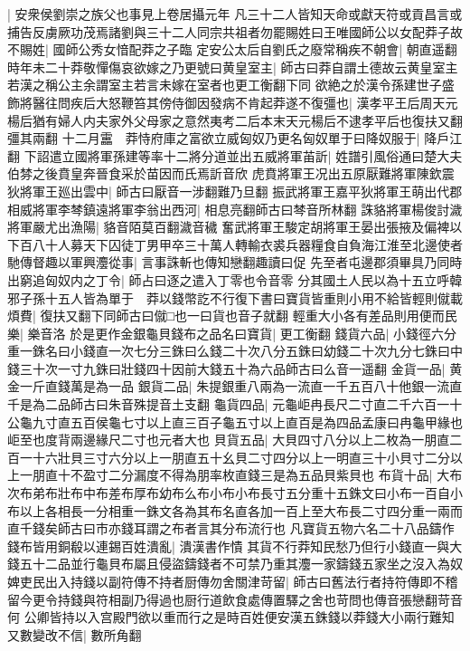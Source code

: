 |{
	安衆侯劉崇之族父也事見上卷居攝元年}
凡三十二人皆知天命或獻天符或貢昌言或捕告反虜厥功茂焉諸劉與三十二人同宗共祖者勿罷賜姓曰王唯國師公以女配莽子故不賜姓|{
	國師公秀女愔配莽之子臨}
定安公太后自劉氏之廢常稱疾不朝會|{
	朝直遥翻}
時年未二十莽敬憚傷哀欲嫁之乃更號曰黄皇室主|{
	師古曰莽自謂土德故云黄皇室主若漢之稱公主余謂室主若言未嫁在室者也更工衡翻下同}
欲絶之於漢令孫建世子盛飾將醫往問疾后大怒鞭笞其傍侍御因發病不肯起莽遂不復彊也|{
	漢孝平王后周天元楊后猶有婦人内夫家外父母家之意然夷考二后本末天元楊后不逮孝平后也復扶又翻彊其兩翻}
十二月靁　莽恃府庫之富欲立威匈奴乃更名匈奴單于曰降奴服于|{
	降戶江翻}
下詔遣立國將軍孫建等率十二將分道並出五威將軍苖訢|{
	姓譜引風俗通曰楚大夫伯棼之後賁皇奔晉食采於苗因而氏焉訢音欣}
虎賁將軍王况出五原厭難將軍陳欽震狄將軍王廵出雲中|{
	師古曰厭音一涉翻難乃旦翻}
振武將軍王嘉平狄將軍王萌出代郡相威將軍李棽鎮遠將軍李翁出西河|{
	相息亮翻師古曰棽音所林翻}
誅貉將軍楊俊討濊將軍嚴尤出漁陽|{
	貉音陌莫百翻濊音穢}
奮武將軍王駿定胡將軍王晏出張掖及偏裨以下百八十人募天下囚徒丁男甲卒三十萬人轉輸衣裘兵器糧食自負海江淮至北邊使者馳傳督趣以軍興灋從事|{
	言事誅斬也傳知戀翻趣讀曰促}
先至者屯邊郡須畢具乃同時出窮追匈奴内之丁令|{
	師占曰逐之遣入丁零也令音零}
分其國土人民以為十五立呼韓邪子孫十五人皆為單于　莽以錢幣訖不行復下書曰寶貨皆重則小用不給皆輕則僦載煩費|{
	復扶又翻下同師古曰僦□也一曰貨也音子就翻}
輕重大小各有差品則用便而民樂|{
	樂音洛}
於是更作金銀龜貝錢布之品名曰寶貨|{
	更工衡翻}
錢貨六品|{
	小錢徑六分重一銖名曰小錢直一次七分三銖曰么錢二十次八分五銖曰幼錢二十次九分七銖曰中錢三十次一寸九銖曰壯錢四十因前大錢五十為六品師古曰么音一遥翻}
金貨一品|{
	黄金一斤直錢萬是為一品}
銀貨二品|{
	朱提銀重八兩為一流直一千五百八十他銀一流直千是為二品師古曰朱音殊提音土支翻}
龜貨四品|{
	元龜岠冉長尺二寸直二千六百一十公龜九寸直五百侯龜七寸以上直三百子龜五寸以上直百是為四品孟康曰冉龜甲緣也岠至也度背兩邊緣尺二寸也元者大也}
貝貨五品|{
	大貝四寸八分以上二枚為一朋直二百一十六壯貝三寸六分以上一朋直五十幺貝二寸四分以上一明直三十小貝寸二分以上一朋直十不盈寸二分漏度不得為朋率枚直錢三是為五品貝紫貝也}
布貨十品|{
	大布次布弟布壯布中布差布厚布幼布么布小布小布長寸五分重十五銖文曰小布一百自小布以上各相長一分相重一銖文各為其布名直各加一百上至大布長二寸四分重一兩而直千錢矣師古曰市亦錢耳謂之布者言其分布流行也}
凡寶貨五物六名二十八品鑄作錢布皆用銅殽以連錫百姓潰亂|{
	潰漢書作憒}
其貨不行莽知民愁乃但行小錢直一與大錢五十二品並行龜貝布屬且侵盜鑄錢者不可禁乃重其灋一家鑄錢五家坐之沒入為奴婢吏民出入持錢以副符傳不持者厨傳勿舍關津苛留|{
	師古曰舊法行者持符傳即不稽留今更令持錢與符相副乃得過也厨行道飲食處傳置驛之舍也苛問也傳音張戀翻苛音何}
公卿皆持以入宫殿門欲以重而行之是時百姓便安漢五銖錢以莽錢大小兩行難知又數變改不信|{
	數所角翻}
